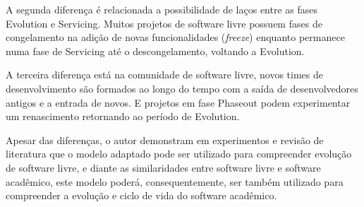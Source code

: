 A segunda diferença é relacionada a possibilidade de laços entre
as fases Evolution e Servicing. Muitos projetos de software livre
possuem fases de congelamento na adição de novas funcionalidades ({\it freeze})
enquanto permanece numa fase de Servicing até o descongelamento, voltando
a Evolution.

A terceira diferença está na comunidade de software livre,
novos times de desenvolvimento são formados ao longo do tempo
com a saída de desenvolvedores antigos e a entrada de novos.
E projetos em fase Phaseout podem experimentar um renascimento
retornando ao período de Evolution.

Apesar das diferenças, o autor  demonstram em experimentos e
revisão de literatura que o modelo adaptado pode ser utilizado para
compreender evolução de software livre, e diante as similaridades entre software livre
e software acadêmico, este modelo poderá, consequentemente, ser também
utilizado para compreender a evolução e ciclo de vida do software acadêmico.
